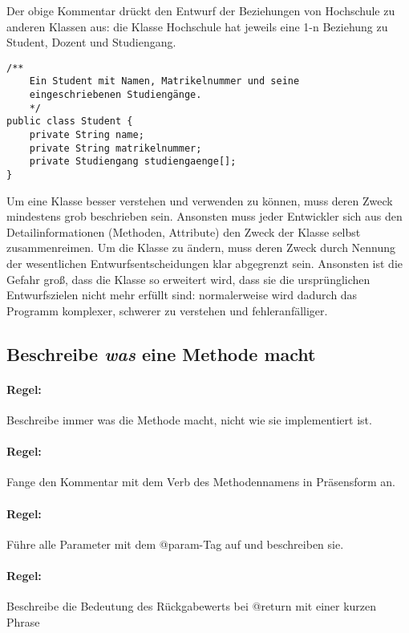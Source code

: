 Der obige Kommentar drückt den Entwurf der Beziehungen von Hochschule zu anderen Klassen aus: die Klasse Hochschule hat jeweils eine 1-n Beziehung zu Student, Dozent und Studiengang.

\begin{lstlisting}
/**
	Ein Student mit Namen, Matrikelnummer und seine
	eingeschriebenen Studiengänge.
	*/
public class Student {
	private String name;
	private String matrikelnummer;
	private Studiengang studiengaenge[];
}
\end{lstlisting}

Um eine Klasse besser verstehen und verwenden zu können, muss deren Zweck mindestens grob beschrieben sein. Ansonsten muss jeder Entwickler sich aus den Detailinformationen (Methoden, Attribute) den Zweck der Klasse selbst zusammenreimen. Um die Klasse zu ändern, muss deren Zweck durch Nennung der wesentlichen Entwurfsentscheidungen klar abgegrenzt sein. Ansonsten ist die Gefahr groß, dass die Klasse so erweitert wird, dass sie die ursprünglichen Entwurfszielen nicht mehr erfüllt sind: normalerweise wird dadurch das Programm komplexer, schwerer zu verstehen und fehleranfälliger.

\subsection{Beschreibe \textit{was} eine Methode macht}

\paragraph{Regel:} Beschreibe immer was die Methode macht, nicht wie sie implementiert ist.
\paragraph{Regel:} Fange den Kommentar mit dem Verb des Methodennamens in Präsensform an.
\paragraph{Regel:} Führe alle Parameter mit dem @param-Tag auf und beschreiben sie.
\paragraph{Regel:} Beschreibe die Bedeutung des Rückgabewerts bei @return mit einer kurzen Phrase

